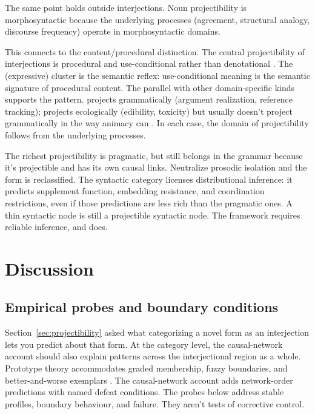 \documentclass[12pt]{article}
\begin{document}
The same point holds outside interjections. Noun projectibility is
morphosyntactic because the underlying processes (agreement, structural
analogy, discourse frequency) operate in morphosyntactic domains.

This connects to the content/procedural distinction. The central
projectibility of interjections is procedural and use-conditional rather
than denotational \citep{TraugottDasher2002}. The
 (expressive) cluster is the semantic
reflex: use-conditional meaning is the semantic signature of procedural
content. The parallel with other domain-specific kinds supports the
pattern.  projects grammatically (argument realization,
reference tracking);  projects ecologically (edibility,
toxicity) but usually doesn't project grammatically in the way animacy
can \citep[cf.][]{seifart2010}. In each case, the domain of
projectibility follows from the underlying processes.

The richest projectibility is pragmatic, but
 still belongs in the grammar
because it's projectible and has its own causal links. Neutralize
prosodic isolation and the form is reclassified. The syntactic category
licenses distributional inference: it predicts supplement function,
embedding resistance, and coordination
restrictions, even if those predictions are less rich than the
pragmatic ones. A thin syntactic node is still a projectible syntactic
node. The framework requires reliable inference, and
 does.

\section{Discussion}\label{sec:discussion}

\subsection{Empirical probes and boundary conditions}

Section~\ref{sec:projectibility} asked what categorizing a novel form as
an interjection lets you predict about that form. At the category level,
the causal-network account should also explain patterns across the
interjectional region as a whole. Prototype theory accommodates graded
membership, fuzzy boundaries, and better-and-worse exemplars
\citep{rosch1975}. The causal-network account adds
network-order predictions with named defeat conditions. The probes
below address stable profiles, boundary behaviour, and failure. They
aren't tests of corrective control.
\end{document}
